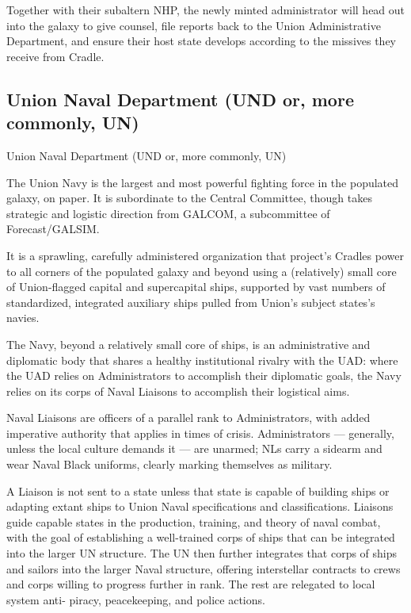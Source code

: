 Together with their subaltern NHP, the newly minted administrator will head out into the galaxy to
give counsel, file reports back to the Union Administrative Department, and ensure their host
state develops according to the missives they receive from Cradle.

\subsection{Union Naval Department (UND or, more commonly, UN)}
Union Naval Department (UND or, more commonly, UN)

The Union Navy is the largest and most powerful fighting force in the populated galaxy, on paper.
It is subordinate to the Central Committee, though takes strategic and logistic direction from
GALCOM, a subcommittee of Forecast/GALSIM.


It is a sprawling, carefully administered organization that project’s Cradles power to all corners of
the populated galaxy and beyond using a (relatively) small core of Union-flagged capital and
supercapital ships, supported by vast numbers of standardized, integrated auxiliary ships pulled
from Union’s subject states’s navies.


The Navy, beyond a relatively small core of ships, is an administrative and diplomatic body that
shares a healthy institutional rivalry with the UAD: where the UAD relies on Administrators to
accomplish their diplomatic goals, the Navy relies on its corps of Naval Liaisons to accomplish
their logistical aims.


Naval Liaisons are officers of a parallel rank to Administrators, with added imperative authority
that applies in times of crisis. Administrators — generally, unless the local culture demands it —
are unarmed; NLs carry a sidearm and wear Naval Black uniforms, clearly marking themselves as
military.


A Liaison is not sent to a state unless that state is capable of building ships or adapting extant
ships to Union Naval specifications and classifications. Liaisons guide capable states in the
production, training, and theory of naval combat, with the goal of establishing a well-trained
corps of ships that can be integrated into the larger UN structure. The UN then further integrates
that corps of ships and sailors into the larger Naval structure, offering interstellar contracts to
crews and corps willing to progress further in rank. The rest are relegated to local system anti-
piracy, peacekeeping, and police actions.


